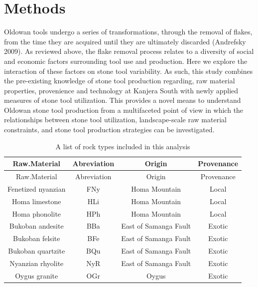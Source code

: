 \documentclass[]{elsarticle} %
\begin{document}
\hypertarget{methods}{%
\section{Methods}\label{methods}}

Oldowan tools undergo a series of transformations, through the removal
of flakes, from the time they are acquired until they are ultimately
discarded (Andrefsky 2009). As reviewed above, the flake removal process
relates to a diversity of social and economic factors surrounding tool
use and production. Here we explore the interaction of these factors on
stone tool variability. As such, this study combines the pre-existing
knowledge of stone tool production regarding, raw material properties,
provenience and technology at Kanjera South with newly applied measures
of stone tool utilization. This provides a novel means to understand
Oldowan stone tool production from a multifaceted point of view in which
the relationships between stone tool utilization, landscape-scale raw
material constraints, and stone tool production strategies can be
investigated.

\begin{longtable}[]{@{}cccc@{}}
\caption{A list of rock types included in this analysis}\tabularnewline
\toprule
Raw.Material & Abreviation & Origin & Provenance\tabularnewline
\midrule
\endfirsthead
\toprule
Raw.Material & Abreviation & Origin & Provenance\tabularnewline
\midrule
\endhead
Fenetized nyanzian & FNy & Homa Mountain & Local\tabularnewline
Homa limestone & HLi & Homa Mountain & Local\tabularnewline
Homa phonolite & HPh & Homa Mountain & Local\tabularnewline
Bukoban andesite & BBa & East of Samanga Fault & Exotic\tabularnewline
Bukoban felsite & BFe & East of Samanga Fault & Exotic\tabularnewline
Bukoban quartzite & BQu & East of Samanga Fault & Exotic\tabularnewline
Nyanzian rhyolite & NyR & East of Samanga Fault & Exotic\tabularnewline
Oygus granite & OGr & Oygus & Exotic\tabularnewline
\bottomrule
\end{longtable}
\end{document}
